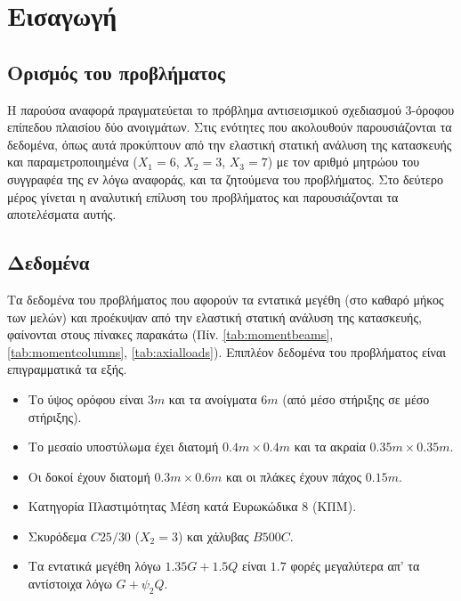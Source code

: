 \pagestyle{fancy}
\chapter{Εισαγωγή}
\section{Ορισμός του προβλήματος}
Η παρούσα αναφορά πραγματεύεται το πρόβλημα αντισεισμικού σχεδιασμού 3-όροφου επίπεδου πλαισίου δύο ανοιγμάτων. Στις ενότητες που ακολουθούν παρουσιάζονται τα δεδομένα, όπως αυτά προκύπτουν από την ελαστική στατική ανάλυση της κατασκευής και παραμετροποιημένα ($X_1 = 6$, $X_2 = 3$, $X_3 = 7$) με τον αριθμό μητρώου του συγγραφέα της εν λόγω αναφοράς, και τα ζητούμενα του προβλήματος. Στο δεύτερο μέρος γίνεται η αναλυτική επίλυση του προβλήματος και παρουσιάζονται τα αποτελέσματα αυτής.

\section{Δεδομένα}
Τα δεδομένα του προβλήματος που αφορούν τα εντατικά μεγέθη (στο καθαρό μήκος των μελών) και προέκυψαν από την ελαστική στατική ανάλυση της κατασκευής, φαίνονται στους πίνακες παρακάτω (Πίν. \ref{tab:momentbeams}, \ref{tab:momentcolumns}, \ref{tab:axialloads}). Επιπλέον δεδομένα του προβλήματος είναι επιγραμματικά τα εξής.

\begin{itemize}
  \item Το ύψος ορόφου είναι $3m$ και τα ανοίγματα $6m$ (από μέσο στήριξης σε μέσο στήριξης).
  \item Το μεσαίο υποστύλωμα έχει διατομή $0.4m\times0.4m$ και τα ακραία $0.35m\times0.35m$.
  \item Οι δοκοί έχουν διατομή $0.3m\times0.6m$ και οι πλάκες έχουν πάχος $0.15m$.
  \item Κατηγορία Πλαστιμότητας Μέση κατά Ευρωκώδικα $8$ (ΚΠΜ).
  \item Σκυρόδεμα $C25/30$ ($X_2 = 3$) και χάλυβας $B500C$.
  \item Τα εντατικά μεγέθη λόγω $1.35G+1.5Q$ είναι $1.7$ φορές
μεγαλύτερα απ' τα αντίστοιχα λόγω $G+\psi_2Q$.
\end{itemize}

